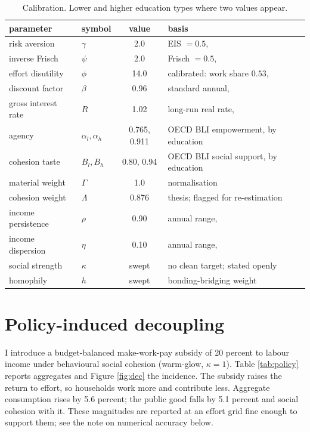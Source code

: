 \documentclass[11pt]{article}
\begin{document}
\begin{table}[t]
\centering
\caption{Calibration. Lower and higher education types where two values appear.}
\label{tab:calib}
\begin{tabular}{llcl}
\toprule
parameter & symbol & value & basis \\
\midrule
risk aversion & $\gamma$ & 2.0 & EIS $= 0.5$, \citet{havranek2015} \\
inverse Frisch & $\psi$ & 2.0 & Frisch $= 0.5$, \citet{chetty2011} \\
effort disutility & $\phi$ & 14.0 & calibrated: work share $0.53$, \citet{roy2012} \\
discount factor & $\beta$ & 0.96 & standard annual, \citet{aiyagari1994} \\
gross interest rate & $R$ & 1.02 & long-run real rate, \citet{holston2017} \\
agency & $\alpha_l, \alpha_h$ & 0.765, 0.911 & OECD BLI empowerment, by education \\
cohesion taste & $B_l, B_h$ & 0.80, 0.94 & OECD BLI social support, by education \\
material weight & $\Gamma$ & 1.0 & normalisation \\
cohesion weight & $\Lambda$ & 0.876 & thesis; flagged for re-estimation \\
income persistence & $\rho$ & 0.90 & annual range, \citet{heathcote2010} \\
income dispersion & $\eta$ & 0.10 & annual range, \citet{heathcote2010} \\
social strength & $\kappa$ & swept & no clean target; stated openly \\
homophily & $h$ & swept & bonding-bridging weight \\
\bottomrule
\end{tabular}
\end{table}

\section{Policy-induced decoupling}

I introduce a budget-balanced make-work-pay subsidy of 20 percent to labour income under behavioural social cohesion (warm-glow, $\kappa = 1$). Table \ref{tab:policy} reports aggregates and Figure \ref{fig:dec} the incidence. The subsidy raises the return to effort, so households work more and contribute less. Aggregate consumption rises by 5.6 percent; the public good falls by 5.1 percent and social cohesion with it. These magnitudes are reported at an effort grid fine enough to support them; see the note on numerical accuracy below.
\end{document}
